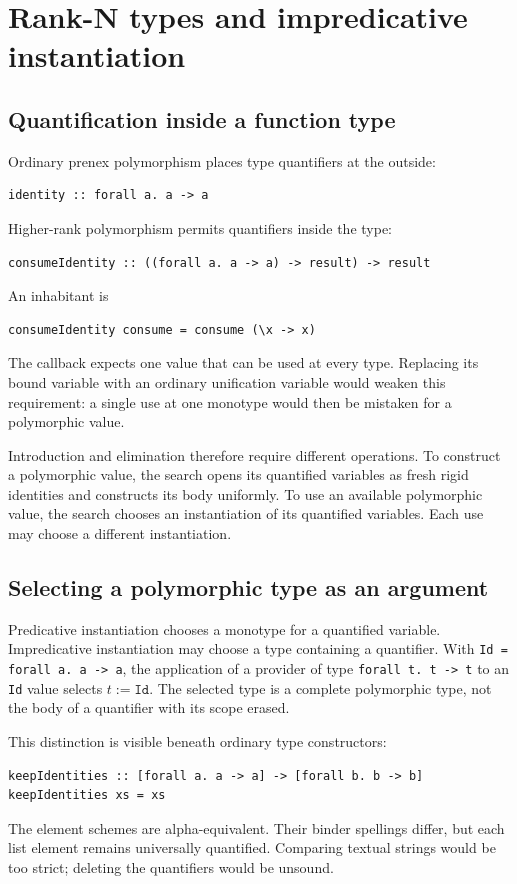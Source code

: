 \documentclass[11pt]{article}
\newcommand{\code}[1]{\texttt{#1}}
\begin{document}
\section{Rank-N types and impredicative instantiation}

\subsection{Quantification inside a function type}

Ordinary prenex polymorphism places type quantifiers at the outside:
\begin{lstlisting}
identity :: forall a. a -> a
\end{lstlisting}
Higher-rank polymorphism permits quantifiers inside the type:
\begin{lstlisting}
consumeIdentity :: ((forall a. a -> a) -> result) -> result
\end{lstlisting}
An inhabitant is
\begin{lstlisting}
consumeIdentity consume = consume (\x -> x)
\end{lstlisting}
The callback expects one value that can be used at every type. Replacing its
bound variable with an ordinary unification variable would weaken this
requirement: a single use at one monotype would then be mistaken for a
polymorphic value.

Introduction and elimination therefore require different operations. To
construct a polymorphic value, the search opens its quantified variables as
fresh rigid identities and constructs its body uniformly. To use an available
polymorphic value, the search chooses an instantiation of its quantified
variables. Each use may choose a different instantiation.

\subsection{Selecting a polymorphic type as an argument}

Predicative instantiation chooses a monotype for a quantified variable.
Impredicative instantiation may choose a type containing a quantifier. With
\code{Id = forall a. a -> a}, the application of a provider of type
\code{forall t. t -> t} to an \code{Id} value selects $t := \code{Id}$.
The selected type is a complete polymorphic type, not the body of a
quantifier with its scope erased.

This distinction is visible beneath ordinary type constructors:
\begin{lstlisting}
keepIdentities :: [forall a. a -> a] -> [forall b. b -> b]
keepIdentities xs = xs
\end{lstlisting}
The element schemes are alpha-equivalent. Their binder spellings differ, but
each list element remains universally quantified. Comparing textual strings
would be too strict; deleting the quantifiers would be unsound.
\end{document}
